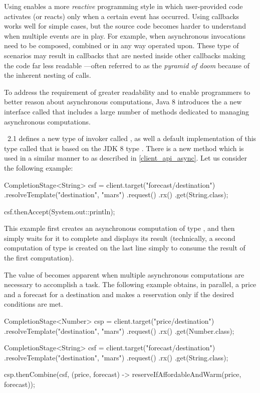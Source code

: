 Using  enables a more \emph{reactive} programming style in which user-provided code activates (or reacts) only when a certain event has occurred. Using callbacks works well for simple cases, but the source code becomes harder to understand when multiple events are in play. For example, when asynchronous invocations need to be composed, combined or in any way operated upon. These type of scenarios may result in callbacks that are nested inside other callbacks making the code far less readable ---often referred to as the \emph{pyramid of doom} because of the inherent nesting of calls.

To address the requirement of greater readability and to enable programmers to better reason about asynchronous computations, Java 8 introduces the a new interface called  that includes a large number of methods dedicated to managing asynchronous computations. 

\jaxrs\ 2.1 defines a new type of invoker called , as well a default implementation of this type called  that is based on the JDK 8 type . There is a new  method which is used in a similar manner to  as described in \ref{client_api_async}. Let us consider the following example:

\begin{listing}{1}
    CompletionStage<String> csf = client.target("forecast/{destination}")
        .resolveTemplate("destination", "mars")
        .request()
        .rx()
        .get(String.class);

    csf.thenAccept(System.out::println);
\end{listing}

This example first creates an asynchronous computation of type , and then simply waits for it to complete and displays its result (technically, a second computation of type  is created on the last line simply to consume the result of the first computation). 

The value of  becomes apparent when multiple asynchronous computations are necessary to accomplish a task. The following example obtains, in parallel, a price and a forecast for a destination and makes a reservation only if the desired conditions are met. 

\begin{listing}{1}
	CompletionStage<Number> csp = client.target("price/{destination}")
        .resolveTemplate("destination", "mars")
        .request()
        .rx()
        .get(Number.class);

	CompletionStage<String> csf = client.target("forecast/{destination}")
	    .resolveTemplate("destination", "mars")
	    .request()
	    .rx()
	    .get(String.class);
	
	csp.thenCombine(csf, (price, forecast) -> 
	    reserveIfAffordableAndWarm(price, forecast));
\end{listing}

